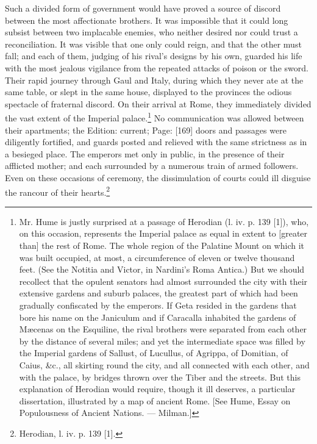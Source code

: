 Such a divided form of government would have proved a source of discord between the most affectionate brothers. It was impossible that it could long subsist between two implacable enemies, who neither desired nor could trust a reconciliation. It was visible that one only could reign, and that the other must fall; and each of them, judging of his rival\texthebrew{}’s designs by his own, guarded his life with the most jealous vigilance from the repeated attacks of poison or the sword. Their rapid journey through Gaul and Italy, during which they never ate at the same table, or slept in the same house, displayed to the provinces the odious spectacle of fraternal discord. On their arrival at Rome, they immediately divided the vast extent of the Imperial palace.\footnote{Mr. Hume is justly surprised at a passage of Herodian (l. iv. p. 139 [1]), who, on this occasion, represents the Imperial palace as equal in extent to [greater than] the rest of Rome. The whole region of the Palatine Mount on which it was built occupied, at most, a circumference of eleven or twelve thousand feet. (See the Notitia and Victor, in Nardini\texthebrew{}’s Roma Antica.) But we should recollect that the opulent senators had almost surrounded the city with their extensive gardens and suburb palaces, the greatest part of which had been gradually confiscated by the emperors. If Geta resided in the gardens that bore his name on the Janiculum and if Caracalla inhabited the gardens of Mæcenas on the Esquiline, the rival brothers were separated from each other by the distance of several miles; and yet the intermediate space was filled by the Imperial gardens of Sallust, of Lucullus, of Agrippa, of Domitian, of Caius, \&c., all skirting round the city, and all connected with each other, and with the palace, by bridges thrown over the Tiber and the streets. But this explanation of Herodian would require, though it ill deserves, a particular dissertation, illustrated by a map of ancient Rome. [See Hume, Essay on Populousness of Ancient Nations. \texthebrew{—} Milman.]} No communication was allowed between their apartments; the Edition: current; Page: [169] doors and passages were diligently fortified, and guards posted and relieved with the same strictness as in a besieged place. The emperors met only in public, in the presence of their afflicted mother; and each surrounded by a numerous train of armed followers. Even on these occasions of ceremony, the dissimulation of courts could ill disguise the rancour of their hearts.\footnote{Herodian, l. iv. p. 139 [1].}

